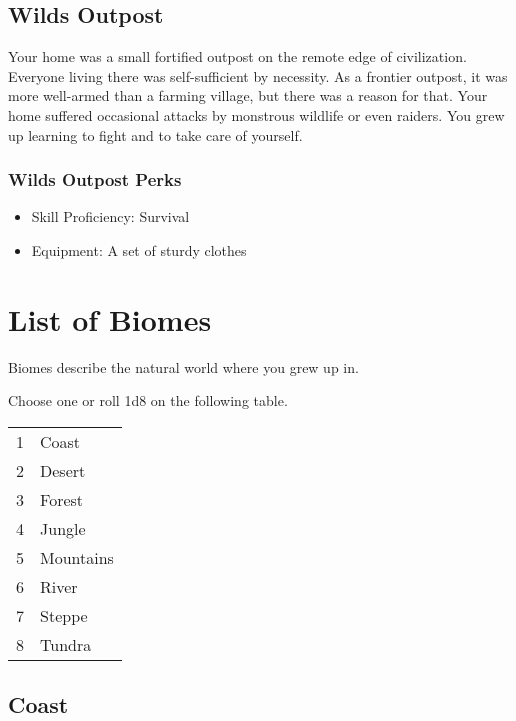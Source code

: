 \begin{multicols}{2}
\subsection{Wilds Outpost}

Your home was a small fortified outpost on the remote edge of civilization.
Everyone living there was self-sufficient by necessity. As a frontier
outpost, it was more well-armed than a farming village, but there was a
reason for that. Your home suffered occasional attacks by monstrous
wildlife or even raiders. You grew up learning to fight and to take
care of yourself.

\subsubsection{Wilds Outpost Perks}

\begin{itemize}
  \item Skill Proficiency: Survival
  \item Equipment: A set of sturdy clothes
\end{itemize}

\section{List of Biomes}

Biomes describe the natural world where you grew up in. 

Choose one or roll 1d8 on the following table.

\begin{center}
{
\begin{xtabular}{|l|l|}
1 & Coast \\
2 & Desert \\
3 & Forest \\
4 & Jungle \\
5 & Mountains \\
6 & River \\
7 & Steppe \\
8 & Tundra \\
\hline
\end{xtabular}
}
\end{center}

\subsection{Coast}


\end{multicols}
